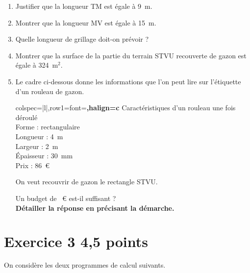\documentclass[12pt,a4paper,french]{article}
\begin{document}
\begin{enumerate}
	\item Justifier que la longueur TM est égale à 9~m.
	\item Montrer que la longueur MV est égale à 15~m.
	\item Quelle longueur de grillage doit-on prévoir ?
	\item Montrer que la surface de la partie du terrain STVU recouverte de gazon est égale à 324~m$^2$.
	\item Le cadre ci-dessous donne les informations que l'on peut lire sur l'étiquette d'un rouleau de gazon.

	\begin{center}
	\begin{tblr}{colspec={|l|},row{1}={font=\bfseries,halign=c}}
		\hline
		Caractéristiques d'un rouleau une fois déroulé \\
		Forme : rectangulaire \\
		Longueur : 4~m \\
		Largeur : 2~m \\
		Épaisseur : 30~mm \\
		Prix : 86~\euro \\ \hline
	\end{tblr}
	\end{center}

	On veut recouvrir de gazon le rectangle STVU.

	Un budget de ~\euro{} est-il suffisant ?\\
	\textbf{Détailler la réponse en précisant la démarche.}
\end{enumerate}

\section*{Exercice 3 \hfill 4,5 points}

On considère les deux programmes de calcul suivants.
\end{document}
